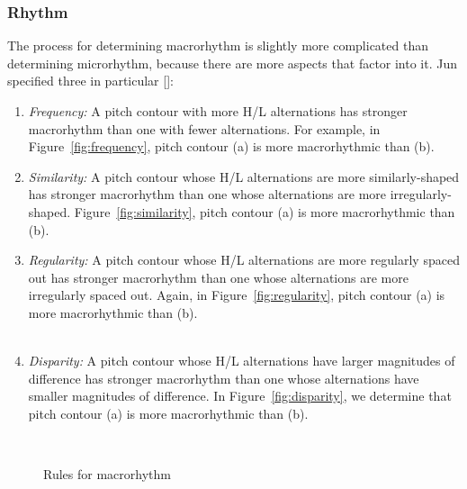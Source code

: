\documentclass[pageno]{jpaper}
\begin{document}
\subsubsection{Rhythm}

The process for determining macrorhythm is slightly more complicated than determining microrhythm, because there are more aspects that factor into it. Jun specified three in particular []:
\begin{enumerate}
  \item \textit{Frequency:}  A pitch contour with more H/L alternations has stronger macrorhythm than one with fewer alternations. For example, in Figure~\ref{fig:frequency}, pitch contour (a) is more macrorhythmic than (b).
  \item  \textit{Similarity:} A pitch contour whose H/L alternations are more similarly-shaped has stronger macrorhythm than one whose alternations are more irregularly-shaped. Figure~\ref{fig:similarity}, pitch contour (a) is more macrorhythmic than (b).
  \item \textit{Regularity:} A pitch contour whose H/L alternations are more regularly spaced out has stronger macrorhythm than one whose alternations are more irregularly spaced out. Again, in Figure~\ref{fig:regularity}, pitch contour (a) is more macrorhythmic than (b).\\
  \\
\item \textit{Disparity:} A pitch contour whose H/L alternations have larger magnitudes of difference has stronger macrorhythm than one whose alternations have smaller magnitudes of difference. In Figure~\ref{fig:disparity}, we determine that pitch contour (a) is more macrorhythmic than (b). 
\end{enumerate}


\begin{figure}
\\
\caption{Rules for macrorhythm}
\label{fig:macrorules}
\end{figure}
\end{document}
